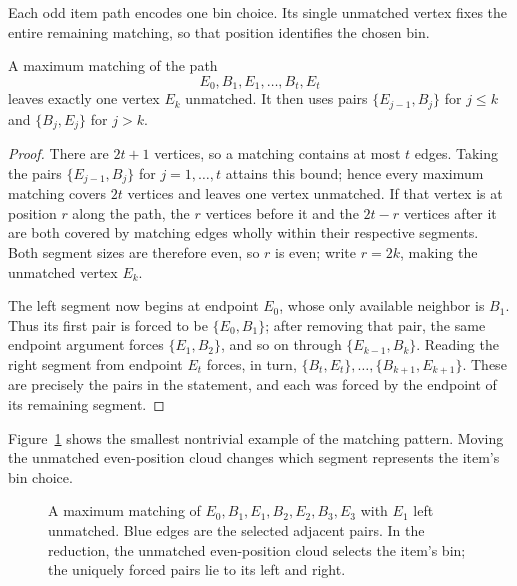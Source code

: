 Each odd item path encodes one bin choice. Its single unmatched vertex
fixes the entire remaining matching, so that position identifies the
chosen bin.

\begin{lemma}\label{lem:odd-path}
A maximum matching of the path
\[
 E_0,B_1,E_1,\ldots,B_t,E_t
\]
leaves exactly one vertex $E_k$ unmatched. It then uses pairs
$\{E_{j-1},B_j\}$ for $j\le k$ and
$\{B_j,E_j\}$ for $j>k$.
\end{lemma}
\begin{proof}
There are $2t+1$ vertices, so a matching contains at most $t$ edges.
Taking the pairs $\{E_{j-1},B_j\}$ for $j=1,\ldots,t$ attains this
bound; hence every maximum matching covers $2t$ vertices and leaves
one vertex unmatched. If that vertex is at position $r$ along the
path, the $r$ vertices before it and the $2t-r$ vertices after it
are both covered by matching edges wholly within their respective
segments. Both segment sizes are therefore even, so $r$ is even;
write $r=2k$, making the unmatched vertex $E_k$.

The left segment now begins at endpoint $E_0$, whose only available
neighbor is $B_1$. Thus its first pair is forced to be
$\{E_0,B_1\}$; after removing that pair, the same endpoint argument
forces $\{E_1,B_2\}$, and so on through $\{E_{k-1},B_k\}$. Reading
the right segment from endpoint $E_t$ forces, in turn,
$\{B_t,E_t\},\ldots,\{B_{k+1},E_{k+1}\}$. These are precisely the
pairs in the statement, and each was forced by the endpoint of its
remaining segment.
\end{proof}

Figure~\ref{fig:odd-path-matching} shows the smallest nontrivial
example of the matching pattern. Moving the unmatched even-position
cloud changes which segment represents the item's bin choice.
\begin{figure}[tbp]
\centering
{}
\caption{A maximum matching of
$E_0,B_1,E_1,B_2,E_2,B_3,E_3$ with $E_1$ left unmatched.
Blue edges are the selected adjacent pairs. In the reduction, the
unmatched even-position cloud selects the item's bin; the uniquely
forced pairs lie to its left and right.}
\label{fig:odd-path-matching}
\end{figure}

